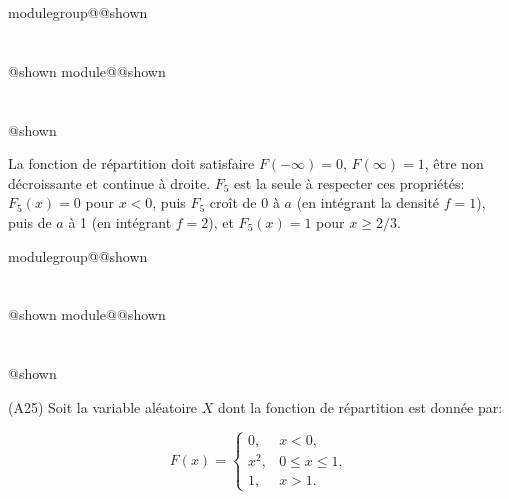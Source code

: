 \documentclass{Evaluation}
\makeatletter
\newcommand{\currentmodulekey}{}
\newcommand{\currentmoduletitle}{}
\newcommand{\currentgroupkey}{}
\newcommand{\currentgrouptitle}{}
\newcommand{\showmoduleifneeded}{%
  \ifx\currentgroupkey\empty\else
    \expandafter\ifx\csname modulegroup@\currentgroupkey @shown\endcsname\relax
      \section*{\currentgrouptitle}%
      \expandafter\gdef\csname modulegroup@\currentgroupkey @shown\endcsname{1}%
    \fi
  \fi
  \expandafter\ifx\csname module@\currentmodulekey @shown\endcsname\relax
    \section*{\currentmoduletitle}%
    \expandafter\gdef\csname module@\currentmodulekey @shown\endcsname{1}%
  \fi
}
\newenvironment{A25}{\showmoduleifneeded}{}
\makeatother
\begin{document}
\begin{questions}
\begin{A25}
\begin{solution}
    La fonction de répartition doit satisfaire $F(-\infty)=0$, $F(\infty)=1$, être non décroissante et continue à droite. $F_5$ est la seule à respecter ces propriétés: $F_5(x)=0$ pour $x<0$, puis $F_5$ croît de 0 à $a$ (en intégrant la densité $f=1$), puis de $a$ à 1 (en intégrant $f=2$), et $F_5(x)=1$ pour $x\geq 2/3$.
\end{solution}
\end{A25}


\begin{A25}
\question (A25) Soit la variable aléatoire $X$ dont la fonction de répartition est donnée par:

$$F(x)=\left\{\begin{array}{ll}
0, & x<0,\\
x^2, & 0\leq x \leq 1,\\
1, & x>1.
\end{array}\right.$$
\end{A25}
\end{questions}
\end{document}

